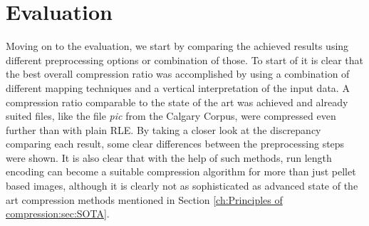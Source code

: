 
\chapter{Evaluation}
\label{ch:Evaluation}
Moving on to the evaluation, we start by comparing the achieved results using different preprocessing options or combination of those. To start of it is clear that the best overall compression ratio was accomplished by using a combination of different mapping techniques and a vertical interpretation of the input data. A compression ratio comparable to the state of the art was achieved and already suited files, like the file \emph{pic} from the Calgary Corpus, were compressed even further than with plain RLE. By taking a closer look at the discrepancy comparing each result, some clear differences between the preprocessing steps were shown. It is also clear that with the help of such methods, run length encoding can become a suitable compression algorithm for more than just pellet based images, although it is clearly not as sophisticated as advanced state of the art compression methods mentioned in Section \ref{ch:Principles of compression:sec:SOTA}.

